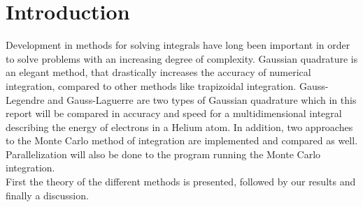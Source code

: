\documentclass[../main.tex]{subfiles}
\begin{document}
\section{Introduction} \label{sec:intro}
Development in methods for solving integrals have long been important in order to solve problems with an increasing degree of complexity. Gaussian quadrature is an elegant method, that drastically increases the accuracy of numerical integration, compared to other methods like trapizoidal integration. Gauss-Legendre and Gauss-Laguerre are two types of Gaussian quadrature which in this report will be compared in accuracy and speed for a multidimensional integral describing the energy of electrons in a Helium atom. In addition, two approaches to the Monte Carlo method of integration are implemented and compared as well. Parallelization will also be done to the program running the Monte Carlo integration.\\
First the theory of the different methods is presented, followed by our results and finally a discussion.
\end{document}
